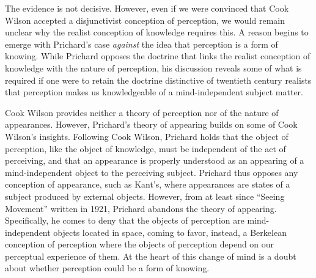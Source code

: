 The evidence is not decisive. However, even if we were convinced that Cook Wilson accepted a disjunctivist conception of perception, we would remain unclear why the realist conception of knowledge requires this. A reason begins to emerge with Prichard's case \emph{against} the idea that perception is a form of knowing. While Prichard opposes the doctrine that links the realist conception of knowledge with the nature of perception, his discussion reveals some of what is required if one were to retain the doctrine distinctive of twentieth century realists that perception makes us knowledgeable of a mind-independent subject matter.

Cook Wilson provides neither a theory of perception nor of the nature of appearances. However, Prichard's \citeyear[]{Prichard:1906gf,Prichard:1909yg} theory of appearing builds on some of Cook Wilson's insights. Following Cook Wilson, Prichard holds that the object of perception, like the object of knowledge, must be independent of the act of perceiving, and that an appearance is properly understood as an appearing of a mind-independent object to the perceiving subject. Prichard thus opposes any conception of appearance, such as Kant's, where appearances are states of a subject produced by external objects. However, from at least since ``Seeing Movement'' written in 1921, Prichard abandons the theory of appearing. Specifically, he comes to deny that the objects of perception are mind-independent objects located in space, coming to favor, instead, a Berkelean conception of perception where the objects of perception depend on our perceptual experience of them. At the heart of this change of mind is a doubt about whether perception could be a form of knowing.


